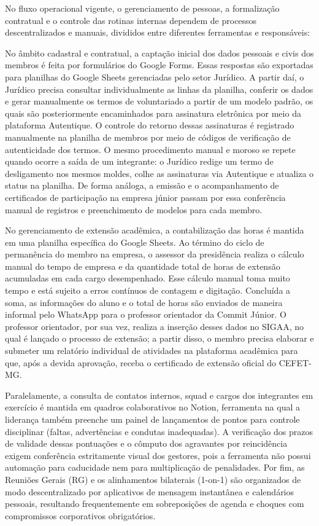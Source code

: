 No fluxo operacional vigente, o gerenciamento de pessoas, a formalização contratual e o controle das rotinas internas dependem de processos descentralizados e manuais, divididos entre diferentes ferramentas e responsáveis:

No âmbito cadastral e contratual, a captação inicial dos dados pessoais e civis dos membros é feita por formulários do Google Forms. Essas respostas são exportadas para planilhas do Google Sheets gerenciadas pelo setor Jurídico. A partir daí, o Jurídico precisa consultar individualmente as linhas da planilha, conferir os dados e gerar manualmente os termos de voluntariado a partir de um modelo padrão, os quais são posteriormente encaminhados para assinatura eletrônica por meio da plataforma Autentique. O controle do retorno dessas assinaturas é registrado manualmente na planilha de membros por meio de códigos de verificação de autenticidade dos termos. O mesmo procedimento manual e moroso se repete quando ocorre a saída de um integrante: o Jurídico redige um termo de desligamento nos mesmos moldes, colhe as assinaturas via Autentique e atualiza o status na planilha. De forma análoga, a emissão e o acompanhamento de certificados de participação na empresa júnior passam por essa conferência manual de registros e preenchimento de modelos para cada membro.

No gerenciamento de extensão acadêmica, a contabilização das horas é mantida em uma planilha específica do Google Sheets. Ao término do ciclo de permanência do membro na empresa, o assessor da presidência realiza o cálculo manual do tempo de empresa e da quantidade total de horas de extensão acumuladas em cada cargo desempenhado. Esse cálculo manual toma muito tempo e está sujeito a erros contínuos de contagem e digitação. Concluída a soma, as informações do aluno e o total de horas são enviados de maneira informal pelo WhatsApp para o professor orientador da Commit Júnior. O professor orientador, por sua vez, realiza a inserção desses dados no SIGAA, no qual é lançado o processo de extensão; a partir disso, o membro precisa elaborar e submeter um relatório individual de atividades na plataforma acadêmica para que, após a devida aprovação, receba o certificado de extensão oficial do CEFET-MG.

Paralelamente, a consulta de contatos internos, squad e cargos dos integrantes em exercício é mantida em quadros colaborativos no Notion, ferramenta na qual a liderança também preenche um painel de lançamentos de pontos para controle disciplinar (faltas, advertências e condutas inadequadas). A verificação dos prazos de validade dessas pontuações e o cômputo dos agravantes por reincidência exigem conferência estritamente visual dos gestores, pois a ferramenta não possui automação para caducidade nem para multiplicação de penalidades. Por fim, as Reuniões Gerais (RG) e os alinhamentos bilaterais (1-on-1) são organizados de modo descentralizado por aplicativos de mensagem instantânea e calendários pessoais, resultando frequentemente em sobreposições de agenda e choques com compromissos corporativos obrigatórios.

